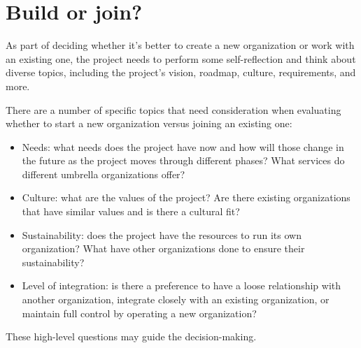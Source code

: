 


\chapter{Build or join?}

As part of deciding whether it's better to create a new organization or work with an existing one, the project needs to perform some self-reflection and think about diverse topics, including the project's vision, roadmap, culture, requirements, and more.

There are a number of specific topics that need consideration when evaluating whether to start a new organization versus joining an existing one:

\begin{itemize}

\item Needs: what needs does the project have now and how will those change in the future as the project moves through different phases?  What services do different umbrella organizations offer?

\item Culture: what are the values of the project?  Are there existing organizations that have similar values and is there a cultural fit?

\item Sustainability: does the project have the resources to run its own organization?  What have other organizations done to ensure their sustainability?

\item Level of integration: is there a preference to have a loose relationship with another organization, integrate closely with an existing organization, or maintain full control by operating a new organization?

\end{itemize}

These high-level questions may guide the decision-making.

